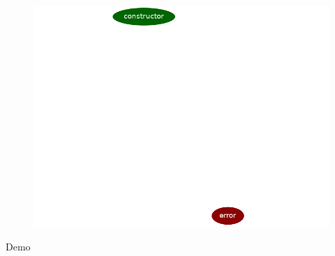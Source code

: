 \documentclass[aspectratio=169,10pt]{beamer}
\begin{document}
\begin{frame}[fragile]
\begin{figure}
	\includegraphics[scale=0.3]{images/state_machine_reachability}
\end{figure}
\end{frame}

\begin{frame}
Demo
\end{frame}
\end{document}
